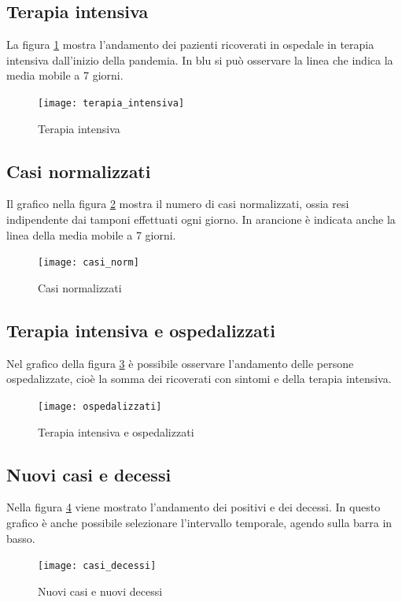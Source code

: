 \subsection{Terapia intensiva}
La figura \ref{fig:terapia_intensiva} mostra l'andamento dei pazienti ricoverati in ospedale in terapia intensiva dall'inizio della pandemia.
In blu si può osservare la linea che indica la media mobile a 7 giorni.
\begin{figure}[htp]
    \centering
    \texttt{[image: terapia\_intensiva]}
    \caption{Terapia intensiva}
    \label{fig:terapia_intensiva}
\end{figure}

\subsection{Casi normalizzati}
Il grafico nella figura \ref{fig:casi_normalizzati} mostra il numero di casi normalizzati, ossia resi indipendente dai tamponi effettuati ogni giorno.
In arancione è indicata anche la linea della media mobile a 7 giorni.
\begin{figure}[htp]
    \centering
    \texttt{[image: casi\_norm]}
    \caption{Casi normalizzati}
    \label{fig:casi_normalizzati}
\end{figure}

\subsection{Terapia intensiva e ospedalizzati}
Nel grafico della figura \ref{fig:ti_ospdedalizzati} è possibile osservare l'andamento delle persone ospedalizzate, cioè la somma dei ricoverati con sintomi e della terapia intensiva.
\begin{figure}[htp]
    \centering
    \texttt{[image: ospedalizzati]}
    \caption{Terapia intensiva e ospedalizzati}
    \label{fig:ti_ospdedalizzati}
\end{figure}



\subsection{Nuovi casi e decessi}
Nella figura \ref{fig:casi_decessi} viene mostrato l'andamento dei positivi e dei decessi.
In questo grafico è anche possibile selezionare l'intervallo temporale, agendo sulla barra in basso.
\begin{figure}[htp]
    \centering
    \texttt{[image: casi\_decessi]}
    \caption{Nuovi casi e nuovi decessi}
    \label{fig:casi_decessi}
\end{figure}

